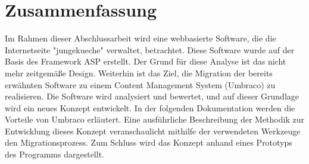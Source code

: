 \chapter*{Zusammenfassung}
Im Rahmen dieser Abschlussarbeit wird eine webbasierte Software, die die Internetseite "jungekueche" verwaltet, betrachtet. Diese Software wurde auf der Basis des Framework ASP erstellt. Der Grund für diese Analyse ist das nicht mehr zeitgemäße Design. Weiterhin ist das Ziel, die Migration der bereits erwähnten Software zu einem Content Management System (Umbraco) zu realisieren. Die Software wird analysiert und bewertet, und auf dieser Grundlage wird ein neues Konzept entwickelt. In der folgenden Dokumentation werden die Vorteile von Umbraco erläutert. Eine ausführliche Beschreibung der Methodik zur Entwicklung dieses Konzept veranschaulicht mithilfe der verwendeten Werkzeuge den Migrationsprozess. Zum Schluss wird das Konzept anhand eines Prototyps des Programms dargestellt.